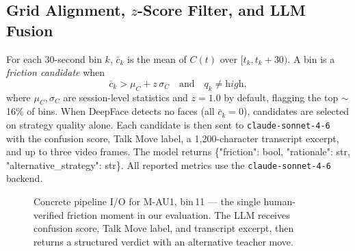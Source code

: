 \documentclass[10pt,twocolumn,letterpaper]{article}
\begin{document}
\subsection{Grid Alignment, $z$-Score Filter, and LLM Fusion}

For each 30-second bin $k$, $\bar{c}_k$ is the mean of $C(t)$ over
$[t_k, t_k{+}30)$.  A bin is a \emph{friction candidate} when
\begin{equation}
  \bar{c}_k > \mu_C + z\,\sigma_C
  \quad\text{and}\quad q_k \neq \textit{high},
  \label{eq:filter}
\end{equation}
where $\mu_C, \sigma_C$ are session-level statistics and $z{=}1.0$
by default, flagging the top $\sim$16\% of bins.  When DeepFace detects no faces (all $\bar{c}_k{=}0$),
candidates are selected on strategy quality alone.  Each candidate
is then sent to \texttt{claude-sonnet-4-6} with the confusion score,
Talk Move label, a 1{,}200-character transcript excerpt, and up to three
video frames.  The model returns
{\small\ttfamily\{"friction": bool, "rationale": str,
"alternative\_strategy": str\}}.
All reported metrics use the \texttt{claude-sonnet-4-6} backend.

\begin{figure}[t]
\small\setlength{\fboxsep}{4pt}\setlength{\fboxrule}{0.6pt}
\caption{Concrete pipeline I/O for M-AU1, bin\,11 --- the single
human-verified friction moment in our evaluation.
The LLM receives confusion score, Talk Move label, and transcript
excerpt, then returns a structured verdict with an alternative teacher move.}
\label{fig:model}
\end{figure}

\end{document}
